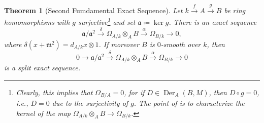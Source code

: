 \documentclass[10pt]{article}
\theoremstyle{thmstyle}
\newtheorem{theorem}{Theorem}[section]
\theoremstyle{defstyle}
\newcommand{\fraka}{\mathfrak{a}} %
\newcommand{\frakm}{\mathfrak{m}} %
\newcommand{\Der}{\operatorname{Der}}
\begin{document}
\begin{theorem}[Second Fumdamental Exact Sequence]
    Let $k\xrightarrow{f}A\xrightarrow{g} B$ be ring homomorphisms with $g$ surjective\footnote{Clearly, this implies that $\Omega_{B/A} = 0$, for if $D\in\Der_A(B, M)$, then $D\circ g = 0$, i.e., $D = 0$ due to the surjectivity of $g$. The point of  is to characterize the kernel of the map $\Omega_{A/k}\otimes_A B\to\Omega_{B/k}$.} and set $\fraka\coloneq \ker g$. There is an exact sequence 
    \begin{equation}
        \fraka/\fraka^2\xrightarrow{\delta}\Omega_{A/k}\otimes_A B\xrightarrow{\alpha}\Omega_{B/k}\to 0,\label{eq:second-right-exact-sequence}
    \end{equation}
    where $\delta(x + \frakm^2) = d_{A/k}x\otimes 1$. If moreover $B$ is $0$-smooth over $k$, then 
    \begin{equation}
        0\to\fraka/\fraka^2\xrightarrow{\delta}\Omega_{A/k}\otimes_A B\xrightarrow{\alpha} \Omega_{B/k}\to 0\label{eq:second-exact-sequence}
    \end{equation}
    is a split exact sequence.
\end{theorem}
\end{document}
